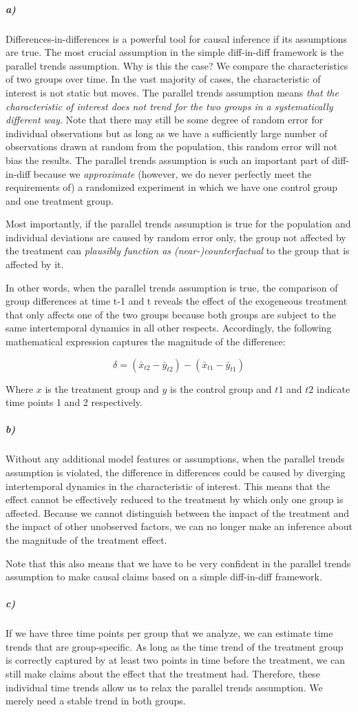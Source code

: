 \documentclass[12pt]{article}\usepackage[]{graphicx}\usepackage[]{color}
\begin{document}
\subparagraph{a)} Differences-in-differences is a powerful tool for causal inference if its assumptions are true. The most crucial assumption in the simple diff-in-diff framework is the parallel trends assumption. Why is this the case? We compare the characteristics of two groups over time. In the vast majority of cases, the characteristic of interest is not static but moves. The parallel trends assumption means \textit{that the characteristic of interest does not trend for the two groups in a systematically different way}. Note that there may still be some degree of random error for individual observations but as long as we have a sufficiently large number of observations drawn at random from the population, this random error will not bias the results. The parallel trends assumption is such an important part of diff-in-diff because we \textit{approximate} (however, we do never perfectly meet the requirements of) a randomized experiment in which we have one control group and one treatment group.

Most importantly, if the parallel trends assumption is true for the population and individual deviations are caused by random error only, the group not affected by the treatment can \textit{plausibly function as (near-)counterfactual} to the group that is affected by it.

In other words, when the parallel trends assumption is true, the comparison of group differences at time t-1 and t reveals the effect of the exogeneous treatment that only affects one of the two groups because both groups are subject to the same intertemporal dynamics in all other respects. Accordingly, the following mathematical expression captures the magnitude of the difference:

$$ \delta = (\bar{x} _{t2} - \bar{y} _{t2}) - (\bar{x} _{t1} - \bar{y} _{t1}) $$

Where $x$ is the treatment group and $y$ is the control group and $t1$ and $t2$ indicate time points 1 and 2 respectively.

\subparagraph{b)} Without any additional model features or assumptions, when the parallel trends assumption is violated, the difference in differences could be caused by diverging intertemporal dynamics in the characteristic of interest. This means that the effect cannot be effectively reduced to the treatment by which only one group is affected. Because we cannot distinguish between the impact of the treatment and the impact of other unobserved factors, we can no longer make an inference about the magnitude of the treatment effect.

Note that this also means that we have to be very confident in the parallel trends assumption to make causal claims based on a simple diff-in-diff framework.

\subparagraph{c)} If we have three time points per group that we analyze, we can estimate time trends that are group-specific. As long as the time trend of the treatment group is correctly captured by at least two points in time before the treatment, we can still make claims about the effect that the treatment had. Therefore, these individual time trends allow us to relax the parallel trends assumption. We merely need a stable trend in both groups.
\end{document}
